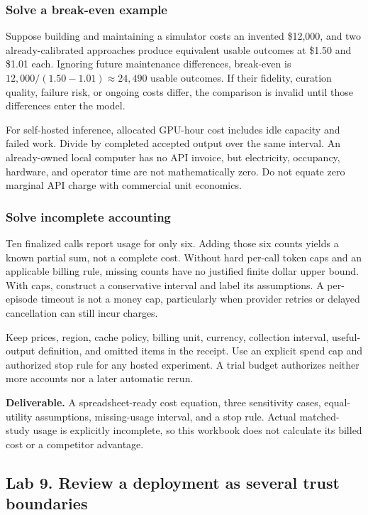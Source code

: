 \documentclass[
  11pt,
  letterpaper,
]{article}
\begin{document}
\subsubsection{Solve a break-even
example}\label{solve-a-break-even-example}

Suppose building and maintaining a simulator costs an invented \$12,000,
and two already-calibrated approaches produce equivalent usable outcomes
at \$1.50 and \$1.01 each. Ignoring future maintenance differences,
break-even is \(12{,}000/(1.50-1.01)\approx24{,}490\) usable outcomes.
If their fidelity, curation quality, failure risk, or ongoing costs
differ, the comparison is invalid until those differences enter the
model.

For self-hosted inference, allocated GPU-hour cost includes idle
capacity and failed work. Divide by completed accepted output over the
same interval. An already-owned local computer has no API invoice, but
electricity, occupancy, hardware, and operator time are not
mathematically zero. Do not equate zero marginal API charge with
commercial unit economics.

\subsubsection{Solve incomplete
accounting}\label{solve-incomplete-accounting}

Ten finalized calls report usage for only six. Adding those six counts
yields a known partial sum, not a complete cost. Without hard per-call
token caps and an applicable billing rule, missing counts have no
justified finite dollar upper bound. With caps, construct a conservative
interval and label its assumptions. A per-episode timeout is not a money
cap, particularly when provider retries or delayed cancellation can
still incur charges.

Keep prices, region, cache policy, billing unit, currency, collection
interval, useful-output definition, and omitted items in the receipt.
Use an explicit spend cap and authorized stop rule for any hosted
experiment. A trial budget authorizes neither more accounts nor a later
automatic rerun.

\textbf{Deliverable.} A spreadsheet-ready cost equation, three
sensitivity cases, equal-utility assumptions, missing-usage interval,
and a stop rule. Actual matched-study usage is explicitly incomplete, so
this workbook does not calculate its billed cost or a competitor
advantage.

\subsection{Lab 9. Review a deployment as several trust
boundaries}\label{lab-9.-review-a-deployment-as-several-trust-boundaries}
\end{document}
